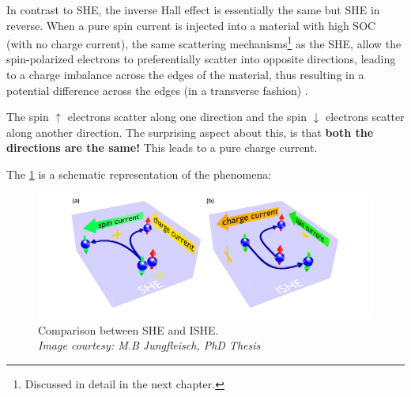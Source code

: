 In contrast to SHE, the inverse Hall effect is essentially the same but SHE in reverse.
When a pure spin current is injected into a material with high SOC (with no charge current), the same scattering mechanisms\footnote{Discussed in detail in the next chapter.} as the SHE, allow the spin-polarized electrons to preferentially scatter into opposite directions, leading to a charge imbalance across the edges of the material, thus resulting in a potential difference across the edges (in a transverse fashion) \cite{d1971possibility}.

The spin $\uparrow$ electrons scatter along one direction and the spin $\downarrow$ electrons scatter along another direction. The surprising aspect about this, is that \textbf{both the directions are the same!}
This leads to a pure charge current.

The \cref{she-vs-ishe} is a schematic representation of the phenomena:

\begin{figure}[h!]
    \includegraphics[width=\columnwidth]{ishe.png}
    \caption{Comparison between SHE and ISHE.\\ \vspace{0.2cm}\textit{Image courtesy: M.B Jungfleisch, PhD Thesis}}
    \label{she-vs-ishe}
\end{figure}
